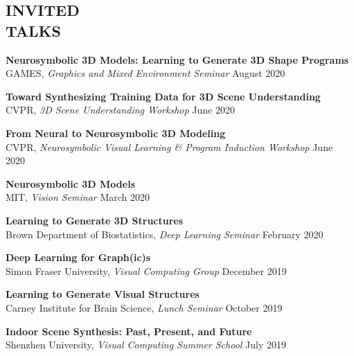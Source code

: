 \documentclass[line,margin]{res}
\begin{document}
\begin{resume}


\section{INVITED\\TALKS}

\newcommand{\talktitle}[1]{
	\textbf{#1}
}
\newcommand{\talk}[3]{
	#1, \emph{#2} \hfill #3
}

\talktitle{Neurosymbolic 3D Models: Learning to Generate 3D Shape Programs}\\
\talk
	{GAMES}
	{Graphics and Mixed Environment Seminar}
	{August 2020}

\talktitle{Toward Synthesizing Training Data for 3D Scene Understanding}\\
\talk
	{CVPR}
	{3D Scene Understanding Workshop}
	{June 2020}

\talktitle{From Neural to Neurosymbolic 3D Modeling}\\
\talk
	{CVPR}
	{Neurosymbolic Visual Learning \& Program Induction Workshop}
	{June 2020}

\talktitle{Neurosymbolic 3D Models}\\
\talk
	{MIT}
	{Vision Seminar}
	{March 2020}

\talktitle{Learning to Generate 3D Structures}\\
\talk
	{Brown Department of Biostatistics}
	{Deep Learning Seminar}
	{February 2020}

\talktitle{Deep Learning for Graph(ic)s}\\
\talk
	{Simon Fraser University}
	{Visual Computing Group}
	{December 2019}

\talktitle{Learning to Generate Visual Structures}\\
\talk
	{Carney Institute for Brain Science}
	{Lunch Seminar}
	{October 2019}

\talktitle{Indoor Scene Synthesis: Past, Present, and Future}\\
\talk
	{Shenzhen University}
	{Visual Computing Summer School}
	{July 2019}


\end{resume}
\end{document}
